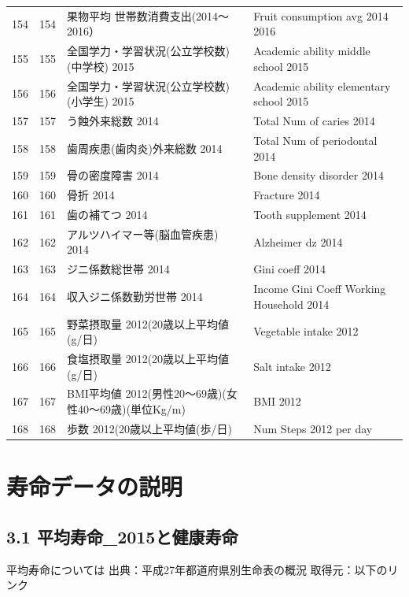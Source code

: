 \begin{table}[ht]
\begin{tabular}{rrll}
  154 & 154 & 果物平均 世帯数消費支出(2014〜2016） & Fruit consumption avg 2014 2016 \\ 
  155 & 155 & 全国学力・学習状況(公立学校数)(中学校) 2015 & Academic ability middle school 2015 \\ 
  156 & 156 & 全国学力・学習状況(公立学校数)(小学生) 2015 & Academic ability elementary school 2015 \\ 
  157 & 157 & う蝕外来総数 2014 & Total Num of caries 2014 \\ 
  158 & 158 & 歯周疾患(歯肉炎)外来総数 2014 & Total Num of periodontal 2014 \\ 
  159 & 159 & 骨の密度障害 2014 & Bone density disorder 2014 \\ 
  160 & 160 & 骨折 2014 & Fracture 2014 \\ 
  161 & 161 & 歯の補てつ 2014 & Tooth supplement 2014 \\ 
  162 & 162 & アルツハイマー等(脳血管疾患) 2014 & Alzheimer dz 2014 \\ 
  163 & 163 & ジニ係数総世帯 2014 & Gini coeff 2014 \\ 
  164 & 164 & 収入ジニ係数勤労世帯 2014 & Income Gini Coeff Working Household 2014 \\ 
  165 & 165 & 野菜摂取量 2012(20歳以上平均値(g/日) & Vegetable intake 2012 \\ 
  166 & 166 & 食塩摂取量 2012(20歳以上平均値(g/日) & Salt intake 2012 \\ 
  167 & 167 & BMI平均値 2012(男性20〜69歳)(女性40〜69歳)(単位Kg/m) & BMI 2012 \\ 
  168 & 168 & 歩数 2012(20歳以上平均値(歩/日) & Num Steps 2012 per day \\ 
   \hline
\end{tabular}
\end{table}









\chapter{寿命データの説明}

\section{3.1 平均寿命\_2015と健康寿命}


平均寿命については
出典：平成27年都道府県別生命表の概況 取得元：以下のリンク

